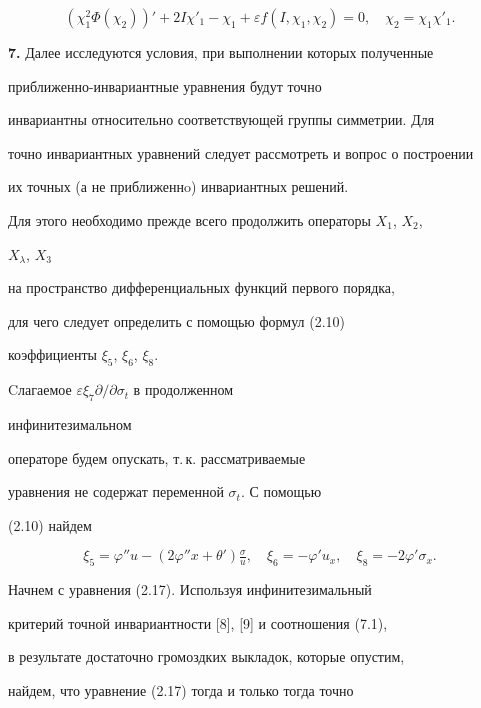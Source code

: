 $$ 


(\chi^2_1\Phi(\chi_2))'+2I\chi'_1-\chi_1+\varepsilon 


f(I,\chi_1,\chi_2)=0,\quad \chi_2=\chi_1\chi'_1. 


$$ 


 


{\bf 7.} Далее исследуются условия, при выполнении которых полученные 


приближенно-инва\-ри\-ант\-ные уравнения будут точно 


инвариантны относительно соответствующей группы симметрии. Для 


точно инвариантных уравнений следует рассмотреть и вопрос о построении 


их точных (а не приближеннo) инвариантных решений. 


Для этого необходимо прежде всего продолжить операторы $X_1$, $X_2$, 


$X_\lambda$, $X_3$ 


на пространство дифференциальных функций первого порядка, 


для чего следует определить с помощью формул (2.10) 


коэффициенты $\xi_5$, $\xi_6$, $\xi_8$.


Cлагаемое $\varepsilon\xi_7\partial /\partial \sigma_t$ в продолженном 


инфинитезимальном 


операторе будем опускать, т.\,к. рассматриваемые 


уравнения не содержат переменной $\sigma_t$. С помощью 


(2.10) найдем 


\begin{equation} 


\xi_5=\varphi''u-(2\varphi''x+\theta')\tfrac{\sigma}{u},\quad 


\xi_6=-\varphi'u_x,\quad \xi_8=-2\varphi'\sigma_x.\tag{7.1} 


\end{equation} 


 


Начнем с уравнения (2.17). Используя инфинитезимальный 


критерий точной инвариантности [8], [9] и соотношения (7.1),


в результате достаточно громоздких выкладок, которые опустим, 


найдем, что уравнение (2.17) тогда и только тогда точно 


